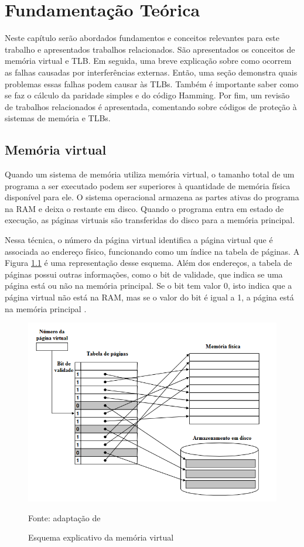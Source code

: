 \chapter{Fundamentação Teórica}

\label{cap:2}

Neste capítulo serão abordados fundamentos e conceitos relevantes para este trabalho e apresentados trabalhos relacionados. São apresentados os conceitos de memória virtual e TLB. Em seguida, uma breve explicação sobre como ocorrem as falhas causadas por interferências externas. Então, uma seção demonstra quais problemas essas falhas podem causar às TLBs. Também é importante saber como se faz o cálculo da paridade simples e do código Hamming. Por fim, um revisão de trabalhos relacionados é apresentada, comentando sobre códigos de proteção à sistemas de memória e TLBs.

\section{Memória virtual}

Quando um sistema de memória utiliza memória virtual, o tamanho total de um
programa a ser executado podem ser
superiores à quantidade de memória física disponível para ele. O sistema operacional
armazena as partes ativas do programa na RAM e deixa o restante em disco. Quando o
programa entra em estado de execução, as páginas virtuais são transferidas do disco para a
memória principal.

Nessa técnica, o número da página virtual identifica a página virtual que é
associada ao endereço físico, funcionando como um índice na tabela de páginas. A Figura \ref{fig:memory} é uma representação desse esquema. Além dos endereços, a tabela de páginas possui outras informações, como o bit de validade, que indica se
uma página está ou não na memória principal. Se o bit tem valor 0, isto indica que a página
virtual não está na RAM, mas se o valor do bit é igual a 1, a página está na memória
principal \cite{Tannenbaum}.

\begin{figure}[ht]
    \centering
    \includegraphics[scale=0.5]{figuras/memoria virtual.PNG}
    \caption{Esquema explicativo da memória virtual}{Fonte: adaptação de \cite{Tannenbaum}}
    \label{fig:memory}
\end{figure}

